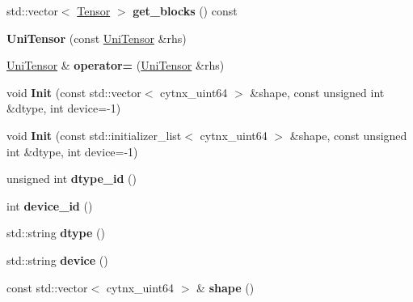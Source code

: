 \begin{DoxyCompactItemize}
std\+::vector$<$ \hyperlink{classcytnx_1_1Tensor}{Tensor} $>$ {\bfseries get\+\_\+blocks} () const
\item 
\mbox{\label{classcytnx_1_1UniTensor_a456aaaa3a3872c0bae08a51336703a51}} 
{\bfseries Uni\+Tensor} (const \hyperlink{classcytnx_1_1UniTensor}{Uni\+Tensor} \&rhs)
\item 
\mbox{\label{classcytnx_1_1UniTensor_a974f13800e8955636a16cfce89f190ee}} 
\hyperlink{classcytnx_1_1UniTensor}{Uni\+Tensor} \& {\bfseries operator=} (\hyperlink{classcytnx_1_1UniTensor}{Uni\+Tensor} \&rhs)
\item 
\mbox{\label{classcytnx_1_1UniTensor_a8fe1b725002f63bf1073d8fc12203ad7}} 
void {\bfseries Init} (const std\+::vector$<$ cytnx\+\_\+uint64 $>$ \&shape, const unsigned int \&dtype, int device=-\/1)
\item 
\mbox{\label{classcytnx_1_1UniTensor_af6eb02650c3b99572dc36bd41c3ebf58}} 
void {\bfseries Init} (const std\+::initializer\+\_\+list$<$ cytnx\+\_\+uint64 $>$ \&shape, const unsigned int \&dtype, int device=-\/1)
\item 
\mbox{\label{classcytnx_1_1UniTensor_aa99c2d2b912d19c87a91fa163aa9a53d}} 
unsigned int {\bfseries dtype\+\_\+id} ()
\item 
\mbox{\label{classcytnx_1_1UniTensor_abb6901db33114b715dde96301a2780c3}} 
int {\bfseries device\+\_\+id} ()
\item 
\mbox{\label{classcytnx_1_1UniTensor_a2eda5502ce5b139d76f1da1e6e42e19c}} 
std\+::string {\bfseries dtype} ()
\item 
\mbox{\label{classcytnx_1_1UniTensor_a10896e0d6a0aeb76b38173e75c094695}} 
std\+::string {\bfseries device} ()
\item 
\mbox{\label{classcytnx_1_1UniTensor_af77d72ff7816d6c0c7da1c2f5605e59d}} 
const std\+::vector$<$ cytnx\+\_\+uint64 $>$ \& {\bfseries shape} ()
\item 
\mbox{\label{classcytnx_1_1UniTensor_a16c6de385a175f3553adfb513cbf1081}} 

\end{DoxyCompactItemize}
